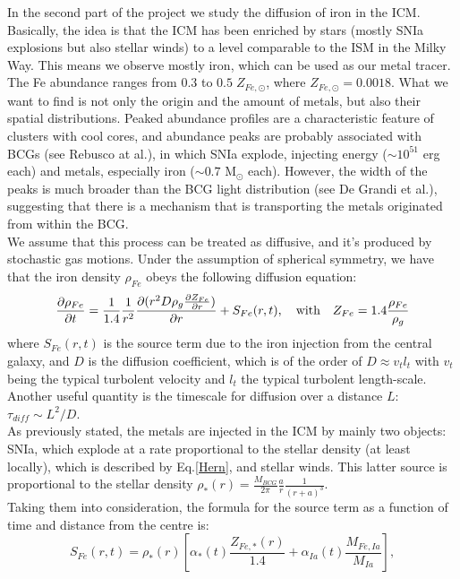 \documentclass{article}
\begin{document}
In the second part of the project we study the diffusion of iron in the ICM. Basically, the idea is that the ICM has been enriched by stars (mostly SNIa explosions but also stellar winds) to a level comparable to the ISM in the Milky Way. This means we observe mostly iron, which can be used as our metal tracer.
The Fe abundance ranges from $0.3$ to $0.5 \; Z_{Fe,\odot}$, where $Z_{Fe,\odot}=0.0018$.
What we want to find is not only the origin and the amount of metals, but also their spatial distributions. Peaked abundance profiles are a characteristic feature of clusters with cool cores, and abundance peaks are probably associated with BCGs (see Rebusco at al.\cite{rebusco}), in which SNIa explode, injecting energy ($\sim 10^{51}$ erg each) and metals, especially iron ($\sim 0.7$ M$_{\odot}$ each).
However, the width of the peaks is much broader than the BCG light distribution (see De Grandi et al.\cite{grandi}), suggesting that there is a mechanism that is transporting the metals originated from within the BCG.\\ 
We assume that this process can be treated as diffusive, and it's produced by stochastic gas motions. Under the assumption of spherical symmetry, we have that the iron density $\rho_{Fe}$ obeys the following diffusion equation:
\begin{equation} \label{diffeq}
	\pdv{\rho_{Fe}}{t}=\frac{1}{1.4}\frac{1}{r^{2}}\pdv{(r^{2}D\rho_{g}\pdv{Z_{Fe}}{r})}{r}+S_{Fe}(r,t), \quad \text{with}\quad Z_{Fe}=1.4\frac{\rho_{Fe}}{\rho_{g}}
\end{equation} 
where $S_{Fe}(r,t)$ is the source term due to the iron injection from the central galaxy, and $D$ is the diffusion coefficient, which is of the order of $D\approx v_{t}l_{t}$ with $v_{t}$ being the typical turbolent velocity and $l_{t}$ the typical turbolent length-scale. Another useful quantity is the timescale for diffusion over a distance $L$: $\tau_{diff}\sim L^{2}/D$.\\
As previously stated, the metals are injected in the ICM by mainly two objects: SNIa, which explode at a rate proportional to the stellar density (at least locally), which is described
by Eq.\eqref{Hern}, and stellar winds. This latter source is proportional to the stellar density $\rho_{*}(r)=\frac{M_{BCG}}{2\pi}\frac{a}{r}\frac{1}{(r+a)^{3}}$.\\
Taking them into consideration, the formula for the source term as a function of time and distance from the centre is:
\begin{equation} \label{source}
		S_{Fe}(r,t)=\rho_{*}(r)\left[\alpha_{*}(t)\frac{Z_{Fe,*}(r)}{1.4}+\alpha_{Ia}(t)\frac{M_{Fe,Ia}}{M_{Ia}}\right],
\end{equation}
\end{document}
